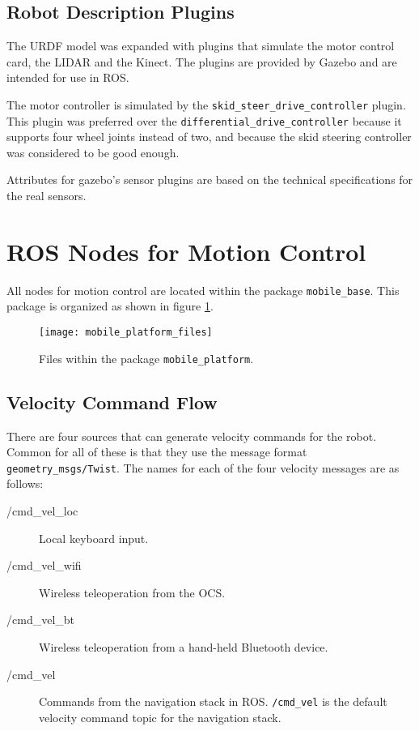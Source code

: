 \subsection{Robot Description Plugins}

The \ac{URDF} model was expanded with plugins that simulate the motor control card, the \ac{LIDAR} and the Kinect. The plugins are provided by Gazebo and are intended for use in \ac{ROS}. 

The motor controller is simulated by the \texttt{skid\_steer\_drive\_controller} plugin. This plugin was preferred over the \texttt{differential\_drive\_controller} because it supports four wheel joints instead of two, and because the skid steering controller was considered to be good enough. 

Attributes for gazebo's sensor plugins are based on the technical specifications\cite{hokuyo_spec} for the real sensors. 

\section{ROS Nodes for Motion Control}

All nodes for motion control are located within the package \texttt{mobile\_base}. This package is organized as shown in figure \ref{fig:mobile_platform_files}.

\begin{figure}[h]
	\centering
	\texttt{[image: mobile\_platform\_files]}
	\caption{Files within the package \texttt{mobile\_platform}.}
	\label{fig:mobile_platform_files}
\end{figure}

\subsection{Velocity Command Flow}

There are four sources that can generate velocity commands for the robot. Common for all of these is that they use the message format \texttt{geometry\_msgs/Twist}. The names for each of the four velocity messages are as follows:

\begin{description}
	\item[/cmd\_vel\_loc] Local keyboard input.
	\item[/cmd\_vel\_wifi] Wireless teleoperation from the \ac{OCS}.
	\item[/cmd\_vel\_bt] Wireless teleoperation from a hand-held Bluetooth device.
	\item[/cmd\_vel] Commands from the navigation stack in \ac{ROS}. \texttt{/cmd\_vel} is the default \: \: velocity command topic for the navigation stack.
\end{description}

